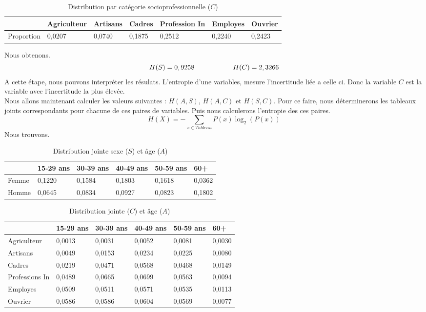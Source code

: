 \documentclass{article}
\begin{document}
\begin{table}[H]
  \centering
  \caption{Distribution par catégorie socioprofessionnelle ($C$)}
  \begin{tabular}{|l|l|l|l|l|l|l|}
  \hline
             & Agriculteur & Artisans & Cadres & Profession In & Employes & Ouvrier \\ \hline
  Proportion & 0,0207      & 0,0740   & 0,1875 & 0,2512        & 0,2240   & 0,2423  \\ \hline
  \end{tabular}
  \end{table}


Nous obtenons.
\[
H(S) = 0,9258  \hspace{2 cm} H(C)= 2,3266
\]
A cette étape, nous pouvons interpréter les résulats. L'entropie d'une variables, mesure l'incertitude liée a celle ci. Donc la variable $C$ est la variable avec l'incertitude la plus élevée.\\
Nous allons maintenant calculer les valeurs suivantes : $H(A,S)$, $H(A,C)$ et $H(S,C)$. Pour ce faire, nous déterminerons les tableaux joints correspondants pour chacune de ces paires de variables. Puis nous calculerons l'entropie des ces paires.
\[
  H(X) = - \sum_{x \in Tableau} P(x) \log_2(P(x))
\]
Nous trouvons.
\begin{table}[H]
  \centering
  \caption{Distribution jointe sexe ($S$) et âge ($A$)}
  \begin{tabular}{|l|l|l|l|l|l|}
  \hline
        & 15-29 ans & 30-39 ans & 40-49 ans & 50-59 ans & 60+    \\ \hline
  Femme & 0,1220    & 0,1584    & 0,1803    & 0,1618    & 0,0362 \\ \hline
  Homme & 0,0645    & 0,0834    & 0,0927    & 0,0823    & 0,1802 \\ \hline
  \end{tabular}
\end{table}

  \begin{table}[H]
    \centering
    \caption{Distribution jointe ($C$) et âge ($A$)}
    \begin{tabular}{|l|l|l|l|l|l|}
    \hline
                   & 15-29 ans & 30-39 ans & 40-49 ans & 50-59 ans & 60+    \\ \hline
    Agriculteur    & 0,0013    & 0,0031    & 0,0052    & 0,0081    & 0,0030 \\ \hline
    Artisans       & 0,0049    & 0,0153    & 0,0234    & 0,0225    & 0,0080 \\ \hline
    Cadres         & 0,0219    & 0,0471    & 0,0568    & 0,0468    & 0,0149 \\ \hline
    Professions In & 0,0489    & 0,0665    & 0,0699    & 0,0563    & 0,0094 \\ \hline
    Employes       & 0,0509    & 0,0511    & 0,0571    & 0,0535    & 0,0113 \\ \hline
    Ouvrier        & 0,0586    & 0,0586    & 0,0604    & 0,0569    & 0,0077 \\ \hline
    \end{tabular}
  \end{table}
\end{document}
